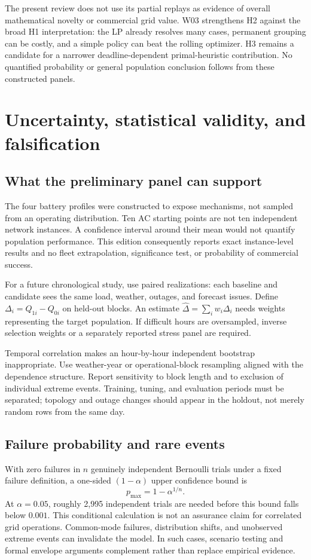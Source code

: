 \documentclass[11pt,letterpaper]{article}
\begin{document}
The present review does not use its partial replays as evidence of overall mathematical novelty or commercial grid value. W03 strengthens H2 against the broad H1 interpretation: the LP already resolves many cases, permanent grouping can be costly, and a simple policy can beat the rolling optimizer. H3 remains a candidate for a narrower deadline-dependent primal-heuristic contribution. No quantified probability or general population conclusion follows from these constructed panels.

\section{Uncertainty, statistical validity, and falsification}
\label{sec:uncertainty}
\subsection{What the preliminary panel can support}
The four battery profiles were constructed to expose mechanisms, not sampled from an operating distribution. Ten AC starting points are not ten independent network instances. A confidence interval around their mean would not quantify population performance. This edition consequently reports exact instance-level results and no fleet extrapolation, significance test, or probability of commercial success.

For a future chronological study, use paired realizations: each baseline and candidate sees the same load, weather, outages, and forecast issues. Define $\Delta_i=Q_{1i}-Q_{0i}$ on held-out blocks. An estimate $\hat\Delta=\sum_iw_i\Delta_i$ needs weights representing the target population. If difficult hours are oversampled, inverse selection weights or a separately reported stress panel are required.

Temporal correlation makes an hour-by-hour independent bootstrap inappropriate. Use weather-year or operational-block resampling aligned with the dependence structure. Report sensitivity to block length and to exclusion of individual extreme events. Training, tuning, and evaluation periods must be separated; topology and outage changes should appear in the holdout, not merely random rows from the same day.

\subsection{Failure probability and rare events}
With zero failures in $n$ genuinely independent Bernoulli trials under a fixed failure definition, a one-sided $(1-\alpha)$ upper confidence bound is
\[
 p_{\max}=1-\alpha^{1/n}.
\]
At $\alpha=0.05$, roughly 2,995 independent trials are needed before this bound falls below $0.001$. This conditional calculation is not an assurance claim for correlated grid operations. Common-mode failures, distribution shifts, and unobserved extreme events can invalidate the model. In such cases, scenario testing and formal envelope arguments complement rather than replace empirical evidence.
\end{document}
